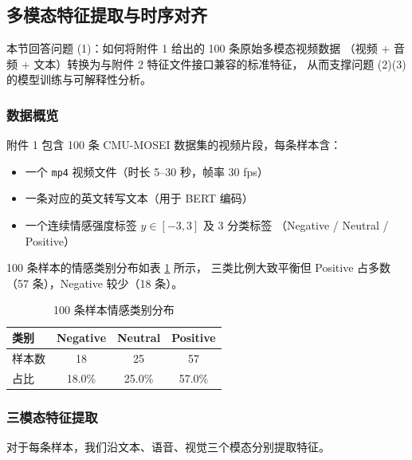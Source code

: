 
\subsection{多模态特征提取与时序对齐}

本节回答问题 (1)：如何将附件 1 给出的 100 条原始多模态视频数据
（视频 + 音频 + 文本）转换为与附件 2 特征文件接口兼容的标准特征，
从而支撑问题 (2)(3) 的模型训练与可解释性分析。

\subsubsection{数据概览}

附件 1 包含 100 条 CMU-MOSEI 数据集的视频片段，每条样本含：

\begin{itemize}
    \item 一个 \texttt{mp4} 视频文件（时长 5--30 秒，帧率 30 fps）
    \item 一条对应的英文转写文本（用于 BERT 编码）
    \item 一个连续情感强度标签 $y \in [-3, 3]$ 及 3 分类标签
          （Negative / Neutral / Positive）
\end{itemize}

100 条样本的情感类别分布如表 \ref{tab:q1-dist} 所示，
三类比例大致平衡但 Positive 占多数（57 条），Negative 较少（18 条）。

\begin{table}[h]
\centering
\caption{100 条样本情感类别分布}
\label{tab:q1-dist}
\begin{tabular}{lccc}
\hline
类别 & Negative & Neutral & Positive \\
\hline
样本数 & 18 & 25 & 57 \\
占比   & 18.0\% & 25.0\% & 57.0\% \\
\hline
\end{tabular}
\end{table}

\subsubsection{三模态特征提取}

对于每条样本，我们沿文本、语音、视觉三个模态分别提取特征。

